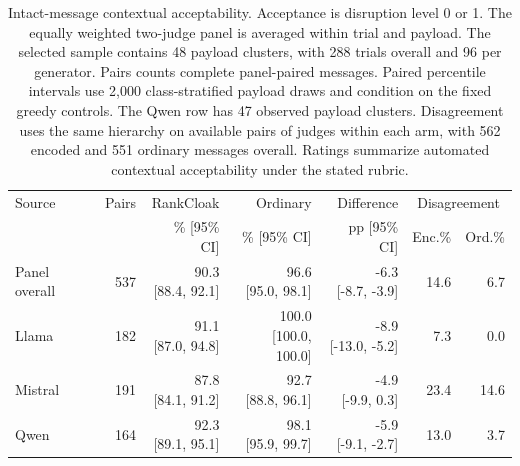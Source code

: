 \begin{table}[H]\centering\small
\begin{tabular}{lrrrrrr}\toprule
Source & Pairs & RankCloak & Ordinary & Difference & \multicolumn{2}{c}{Disagreement}\\
 & & \% [95\% CI] & \% [95\% CI] & pp [95\% CI] & Enc.\% & Ord.\%\\\midrule
Panel overall & 537 & \shortstack{90.3\\{}[88.4, 92.1]} & \shortstack{96.6\\{}[95.0, 98.1]} & \shortstack{-6.3\\{}[-8.7, -3.9]} & 14.6 & 6.7\\
Llama & 182 & \shortstack{91.1\\{}[87.0, 94.8]} & \shortstack{100.0\\{}[100.0, 100.0]} & \shortstack{-8.9\\{}[-13.0, -5.2]} & 7.3 & 0.0\\
Mistral & 191 & \shortstack{87.8\\{}[84.1, 91.2]} & \shortstack{92.7\\{}[88.8, 96.1]} & \shortstack{-4.9\\{}[-9.9, 0.3]} & 23.4 & 14.6\\
Qwen & 164 & \shortstack{92.3\\{}[89.1, 95.1]} & \shortstack{98.1\\{}[95.9, 99.7]} & \shortstack{-5.9\\{}[-9.1, -2.7]} & 13.0 & 3.7\\
\bottomrule\end{tabular}
\caption{Intact-message contextual acceptability. Acceptance is disruption level 0 or 1. The equally weighted two-judge panel is averaged within trial and payload. The selected sample contains 48 payload clusters, with 288 trials overall and 96 per generator. Pairs counts complete panel-paired messages. Paired percentile intervals use 2,000 class-stratified payload draws and condition on the fixed greedy controls. The Qwen row has 47 observed payload clusters. Disagreement uses the same hierarchy on available pairs of judges within each arm, with 562 encoded and 551 ordinary messages overall. Ratings summarize automated contextual acceptability under the stated rubric.}\label{tab:v4-contextual}
\end{table}
